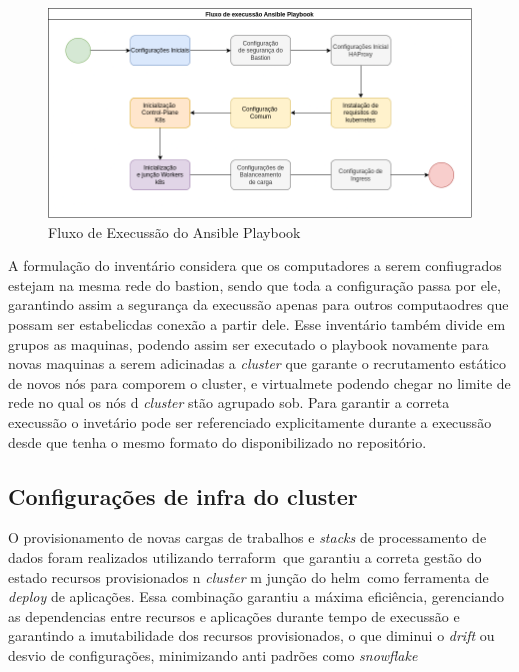 \begin{figure}[!ht]
    \centering
    \includegraphics[width=\linewidth]{04-figuras/ansibleflow.png}
    \caption{Fluxo de Execussão do Ansible Playbook}
    \label{fig:ansibleflow}
\end{figure}

A formulação do inventário considera que os computadores a serem confiugrados estejam na mesma rede do bastion, sendo que toda a configuração passa por ele, garantindo assim a segurança da execussão apenas para outros computaodres que possam ser estabelicdas conexão a partir dele. Esse inventário também divide em grupos as maquinas, podendo assim ser executado o playbook novamente para novas maquinas a serem adicinadas a \emph{cluster}  que garante o recrutamento estático de novos nós para comporem o cluster, e virtualmete podendo chegar no limite de rede no qual os nós d \emph{cluster} stão agrupado sob. Para garantir a correta execussão o invetário pode ser referenciado explicitamente durante a execussão desde que tenha o mesmo formato do disponibilizado no repositório.

\subsection{Configurações de infra do cluster}
O provisionamento de novas cargas de trabalhos e \emph{stacks} de processamento de dados foram realizados utilizando terraform\textregistered \ que garantiu a correta gestão do estado recursos provisionados n \emph{cluster} m junção do helm\textregistered \ como ferramenta de \emph{deploy} de aplicações. Essa combinação garantiu a máxima eficiência, gerenciando as dependencias entre recursos e aplicações durante tempo de execussão e garantindo a imutabilidade dos recursos provisionados, o que diminui o \emph{drift} ou desvio de configurações, minimizando anti padrões como \emph{snowflake}\cite{snowflakeanti}

